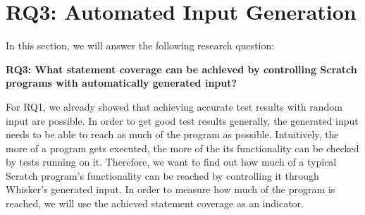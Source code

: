 
\section{RQ3: Automated Input Generation}
\label{sec:rq3}

In this section, we will answer the following research question:

\begin{center}\begin{minipage}{.9\textwidth}
    \textbf{RQ3: What statement coverage can be achieved by controlling Scratch programs with automatically generated input?}
\end{minipage}\end{center}

\noindent For RQ1, we already showed that achieving accurate test results with random input are possible.
In order to get good test results generally, the generated input needs to be able to reach as much of the program as possible.
Intuitively, the more of a program gets executed, the more of the its functionality can be checked by tests running on it.
Therefore, we want to find out how much of a typical Scratch program's functionality can be reached by controlling it through Whisker's generated input.
In order to measure how much of the program is reached, we will use the achieved statement coverage as an indicator.
\parspace

